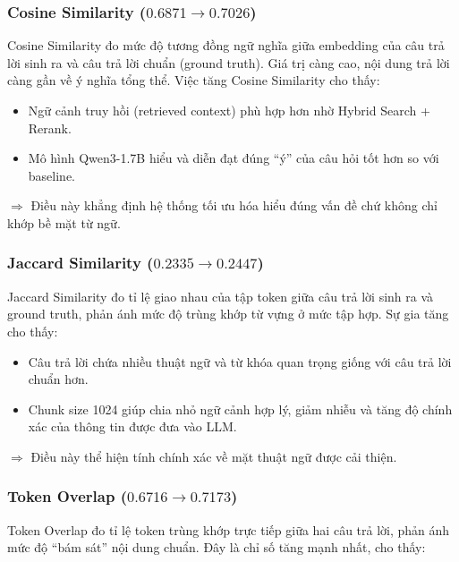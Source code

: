 \subsubsection*{Cosine Similarity ($0.6871 \rightarrow 0.7026$)}

Cosine Similarity đo mức độ tương đồng ngữ nghĩa giữa embedding của câu trả lời sinh ra và
câu trả lời chuẩn (ground truth). Giá trị càng cao, nội dung trả lời càng gần về ý nghĩa tổng
thể. Việc tăng Cosine Similarity cho thấy:

\begin{itemize}
    \item Ngữ cảnh truy hồi (retrieved context) phù hợp hơn nhờ Hybrid Search + Rerank.
    \item Mô hình Qwen3-1.7B hiểu và diễn đạt đúng ``ý'' của câu hỏi tốt hơn so với baseline.
\end{itemize}

$\Rightarrow$ Điều này khẳng định hệ thống tối ưu hóa hiểu đúng vấn đề chứ không chỉ khớp bề mặt từ ngữ.

\subsubsection*{Jaccard Similarity ($0.2335 \rightarrow 0.2447$)}

Jaccard Similarity đo tỉ lệ giao nhau của tập token giữa câu trả lời sinh ra và ground truth,
phản ánh mức độ trùng khớp từ vựng ở mức tập hợp. Sự gia tăng cho thấy:

\begin{itemize}
    \item Câu trả lời chứa nhiều thuật ngữ và từ khóa quan trọng giống với câu trả lời chuẩn hơn.
    \item Chunk size 1024 giúp chia nhỏ ngữ cảnh hợp lý, giảm nhiễu và tăng độ chính xác của
    thông tin được đưa vào LLM.
\end{itemize}

$\Rightarrow$ Điều này thể hiện tính chính xác về mặt thuật ngữ được cải thiện.

\subsubsection*{Token Overlap ($0.6716 \rightarrow 0.7173$)}

Token Overlap đo tỉ lệ token trùng khớp trực tiếp giữa hai câu trả lời, phản ánh mức độ ``bám
sát'' nội dung chuẩn. Đây là chỉ số tăng mạnh nhất, cho thấy:

